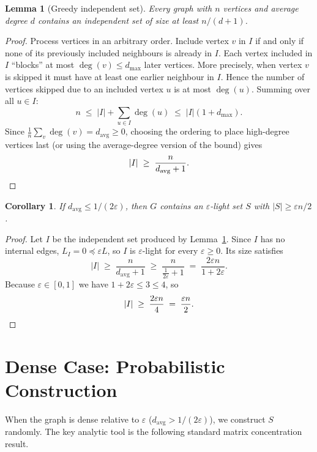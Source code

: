 \documentclass[12pt]{article}
\newtheorem{lemma}[theorem]{Lemma}
\newtheorem{corollary}[theorem]{Corollary}
\theoremstyle{definition}
\theoremstyle{remark}
\begin{document}
\begin{lemma}[Greedy independent set]\label{lem:greedy}
Every graph with $n$ vertices and average degree $d$ contains an independent
set of size at least $n/(d+1)$.
\end{lemma}

\begin{proof}
Process vertices in an arbitrary order.  Include vertex $v$ in $I$ if and
only if none of its previously included neighbours is already in $I$.  Each
vertex included in $I$ ``blocks'' at most $\deg(v) \le d_{\max}$ later
vertices.  More precisely, when vertex $v$ is skipped it must have at least
one earlier neighbour in $I$.  Hence the number of vertices skipped due to
an included vertex $u$ is at most $\deg(u)$.  Summing over all $u \in I$:
\[
  n \;\le\; |I| + \sum_{u \in I}\deg(u) \;\le\; |I|(1 + d_{\max}).
\]
Since $\frac{1}{n}\sum_v \deg(v) = d_{\mathrm{avg}} \ge 0$, choosing the
ordering to place high-degree vertices last (or using the average-degree
version of the bound) gives
\[
  |I| \;\ge\; \frac{n}{d_{\mathrm{avg}} + 1}. \qedhere
\]
\end{proof}

\begin{corollary}\label{cor:sparse}
If $d_{\mathrm{avg}} \le 1/(2\varepsilon)$, then $G$ contains an $\varepsilon$-light
set $S$ with $|S| \ge \varepsilon n / 2$.
\end{corollary}

\begin{proof}
Let $I$ be the independent set produced by Lemma~\ref{lem:greedy}.  Since
$I$ has no internal edges, $L_I = 0 \preceq \varepsilon L$, so $I$ is
$\varepsilon$-light for every $\varepsilon \ge 0$.  Its size satisfies
\[
  |I| \;\ge\; \frac{n}{d_{\mathrm{avg}} + 1}
       \;\ge\; \frac{n}{\tfrac{1}{2\varepsilon}+1}
       \;=\;   \frac{2\varepsilon n}{1+2\varepsilon}.
\]
Because $\varepsilon \in [0,1]$ we have $1+2\varepsilon \le 3 \le 4$, so
\[
  |I| \;\ge\; \frac{2\varepsilon n}{4} \;=\; \frac{\varepsilon n}{2}. \qedhere
\]
\end{proof}

\section{Dense Case: Probabilistic Construction}

When the graph is dense relative to $\varepsilon$ ($d_{\mathrm{avg}} > 1/(2\varepsilon)$),
we construct $S$ randomly.  The key analytic tool is the following standard
matrix concentration result.
\end{document}
